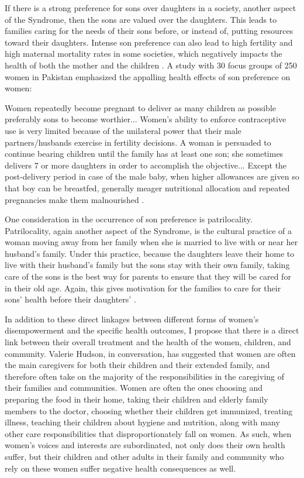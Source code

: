 If there is a strong preference for sons over daughters in a society, another aspect of the Syndrome, then the sons are valued over the daughters. This leads to families caring for the needs of their sons before, or instead of, putting resources toward their daughters. Intense son preference can also lead to high fertility and high maternal mortality rates in some societies, which negatively impacts the health of both the mother and the children \citep{AfghanWomen}. A study with 30 focus groups of 250 women in Pakistan emphasized the appalling health effects of son preference on women: 

\singlespace
Women repeatedly become pregnant to deliver as many children as possible preferably sons to become worthier... Women’s ability to enforce contraceptive use is very limited because of the unilateral power that their male partners/husbands exercise in fertility decisions. A woman is persuaded to continue bearing children until the family has at least one son; she sometimes delivers 7 or more daughters in order to accomplish the objective... Except the post-delivery period in case of the male baby, when higher allowances are given so that boy can be breastfed, generally meager nutritional allocation and repeated pregnancies make them malnourished \citep{Rizvi}.

\doublespace
One consideration in the occurrence of son preference is patrilocality. Patrilocality, again another aspect of the Syndrome, is the cultural practice of a woman moving away from her family when she is married to live with or near her husband's family. Under this practice, because the daughters leave their home to live with their husband's family but the sons stay with their own family, taking care of the sons is the best way for parents to ensure that they will be cared for in their old age. Again, this gives motivation for the families to care for their sons' health before their daughters' \citep{DasGupta}. 

In addition to these direct linkages between different forms of women's disempowerment and the specific health outcomes, I propose that there is a direct link between their overall treatment and the health of the women, children, and community. Valerie Hudson, in conversation, has suggested that women are often the main caregivers for both their children and their extended family, and therefore often take on the majority of the responsibilities in the caregiving of their families and communities. Women are often the ones choosing and preparing the food in their home, taking their children and elderly family members to the doctor, choosing whether their children get immunized, treating illness, teaching their children about hygiene and nutrition, along with many other care responsibilities that disproportionately fall on women. As such, when women's voices and interests are subordinated, not only does their own health suffer, but their children and other adults in their family and community who rely on these women suffer negative health consequences as well. 

